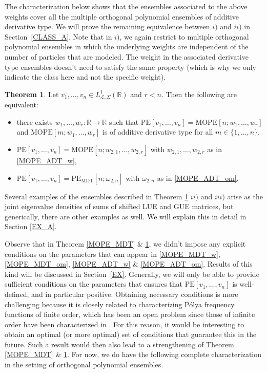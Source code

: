\documentclass[a4paper,12pt,oneside]{article}
\theoremstyle{definition}
\newtheorem{thm}[defi]{Theorem}
\newcommand{\R}{\mathbb{R}}
\newcommand{\om}{\omega}
\newcommand{\LT}[1]{\mathcal{L}#1}
\begin{document}
The characterization below shows that the ensembles associated to the above weights cover all the multiple orthogonal polynomial ensembles of additive derivative type. We will prove the remaining equivalence between $i)$ and $ii)$ in Section~\ref{CLASS_A}. Note that in $i)$, we again restrict to multiple orthogonal polynomial ensembles in which the underlying weights are independent of the number of particles that are modeled. The weight in the associated derivative type ensembles doesn't need to satisfy the same property (which is why we only indicate the class here and not the specific weight). 


\begin{thm} \label{MOPE_ADT}
    Let $v_1,\dots,v_n\in L^{1}_{\LT{},\Sigma}(\R)$ and $r<n$. Then the following are equivalent:
    \begin{itemize}
        \item[$i)$] there exists $w_1,\dots,w_r:\R\to\R$ such that $\text{PE}[v_1,\dots,v_n]=\text{MOPE}[n;w_1,\dots,w_r]$ and $\text{MOPE}[m;w_1,\dots,w_r]$ is of additive derivative type for all $m\in\{1,\dots,n\}$.
        \item [$ii)$] $\text{PE}[v_1,\dots,v_n]=\text{MOPE}[n;w_{2,1},\dots,w_{2,r}]$ with $w_{2,1},\dots,w_{2,r}$ as in \eqref{MOPE_ADT_w},
        \item [$iii)$] $\text{PE}[v_1,\dots,v_n]=\text{PE}_{\text{MDT}}[n;\om_{2,n}]$ with $\om_{2,n}$ as in \eqref{MOPE_ADT_om}.
    \end{itemize}
\end{thm}

Several examples of the ensembles described in Theorem \ref{MOPE_ADT} $ii)$ and $iii)$ arise as the joint eigenvalue densities of sums of shifted LUE and GUE matrices, but generically, there are other examples as well. We will explain this in detail in Section \ref{EX_A}.
\medbreak

Observe that in Theorem \ref{MOPE_MDT} \& \ref{MOPE_ADT}, we didn't impose any explicit conditions on the parameters that can appear in \eqref{MOPE_MDT_w}, \eqref{MOPE_MDT_om}, \eqref{MOPE_ADT_w} \& \eqref{MOPE_ADT_om}. Results of this kind will be discussed in Section~\ref{EX}. Generally, we will only be able to provide sufficient conditions on the parameters that ensures that $\text{PE}[v_1,\dots,v_n]$ is well-defined, and in particular positive. Obtaining necessary conditions is more challenging because it is closely related to characterizing Pólya frequency functions of finite order, which has been an open problem since those of infinite order have been characterized in \cite{S:PFF}. For this reason, it would be interesting to obtain an optimal (or more optimal) set of conditions that guarantee this in the future. Such a result would then also lead to a strengthening of Theorem \ref{MOPE_MDT} \& \ref{MOPE_ADT}. For now, we do have the following complete characterization in the setting of orthogonal polynomial ensembles.
\medbreak
\end{document}
